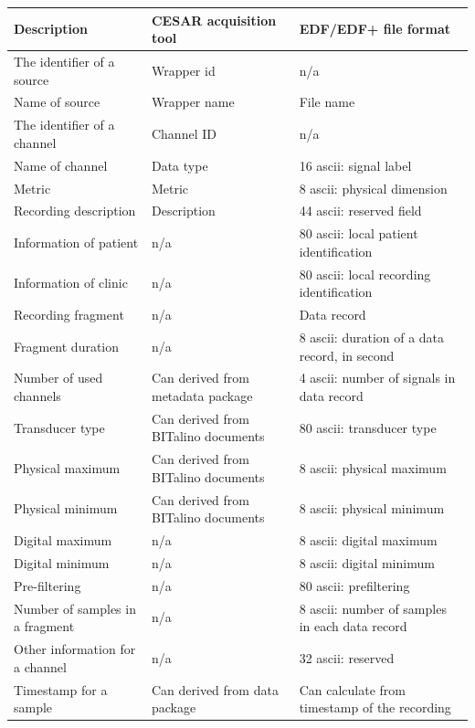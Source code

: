 \begin{table}[H]
\small
\begin{adjustwidth}{-1.5cm}{}
\begin{center}
\begin{tabular}{ |p{5cm}||p{4.5cm}|p{5.5cm}|  }
 \hline
 Description& CESAR acquisition tool & EDF/EDF+ file format \\
 \hline
 The identifier of a source& Wrapper id& n/a\\
 \hline
 Name of source& Wrapper name& File name\\
 \hline
 The identifier of a channel& Channel ID& n/a\\
 \hline
 Name of channel& Data type& 16 ascii: signal label\\
 \hline
 Metric& Metric& 8 ascii: physical dimension\\
 \hline
 Recording description& Description& 44 ascii: reserved field\\
 \hline
 Information of patient& n/a& 80 ascii: local patient identification\\
 \hline
 Information of clinic& n/a& 80 ascii: local recording identification\\
 \hline
 Recording fragment& n/a& Data record\\
 \hline
 Fragment duration& n/a& 8 ascii: duration of a data record, in second\\
 \hline
 Number of used channels& Can derived from metadata package& 4 ascii: number of signals in data record\\
 \hline
 Transducer type& Can derived from BITalino documents& 80 ascii: transducer type\\
 \hline
 Physical maximum& Can derived from BITalino documents& 8 ascii: physical maximum\\
 \hline
 Physical minimum& Can derived from BITalino documents& 8 ascii: physical minimum\\
 \hline
 Digital maximum& n/a& 8 ascii: digital maximum\\
 \hline
 Digital minimum& n/a& 8 ascii: digital minimum\\
 \hline
 Pre-filtering& n/a& 80 ascii: prefiltering\\
 \hline
 Number of samples in a fragment& n/a& 8 ascii: number of samples in each data record\\
 \hline
 Other information for a channel& n/a& 32 ascii: reserved\\
 \hline
 Timestamp for a sample& Can derived from data package& Can calculate from timestamp of the recording\\

\end{tabular}
\end{center}
\end{adjustwidth}
\end{table}
